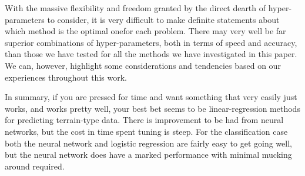 \documentclass[reprint, english, nofootinbib]{revtex4-2}
\begin{document}

With the massive flexibility and freedom granted by the direct dearth of hyper-parameters to consider, it is very difficult to make definite statements about which method is the optimal onefor each problem. There may very well be far superior combinations of hyper-parameters, both in terms of speed and accuracy, than those we have tested for all the methods we have investigated in this paper. We can, however, highlight some considerations and tendencies based on our experiences throughout this work.



In summary, if you are pressed for time and want something that very easily just works, and works pretty well, your best bet seems to be linear-regression methods for predicting terrain-type data. There is improvement to be had from neural networks, but the cost in time spent tuning is steep. For the classification case both the neural network and logistic regression are fairly easy to get going well, but the neural network does have a marked performance with minimal mucking around required.


\onecolumngrid

\newpage
\twocolumngrid
\appendix
\end{document}
